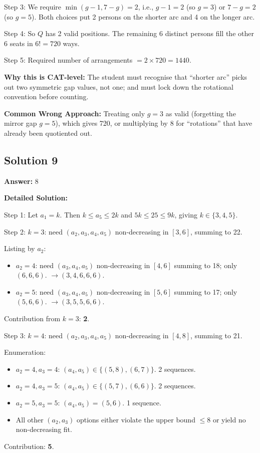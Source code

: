 \documentclass[11pt,a4paper]{article}
\begin{document}
Step 3: We require \(\min(g - 1, 7 - g) = 2\), i.e., \(g - 1 = 2\) (so \(g = 3\)) or \(7 - g = 2\) (so \(g = 5\)). Both choices put 2 persons on the shorter arc and 4 on the longer arc.

Step 4: So \(Q\) has 2 valid positions. The remaining 6 distinct persons fill the other 6 seats in \(6! = 720\) ways.

Step 5: Required number of arrangements \(= 2 \times 720 = 1440\).

\textbf{Why this is CAT-level:} The student must recognise that ``shorter arc'' picks out two symmetric gap values, not one; and must lock down the rotational convention before counting.

\textbf{Common Wrong Approach:} Treating only \(g = 3\) as valid (forgetting the mirror gap \(g = 5\)), which gives 720, or multiplying by 8 for ``rotations'' that have already been quotiented out.

\subsection*{Solution 9}
\textbf{Answer:} 8

\textbf{Detailed Solution:}

Step 1: Let \(a_1 = k\). Then \(k \leq a_5 \leq 2k\) and \(5k \leq 25 \leq 9k\), giving \(k \in \{3, 4, 5\}\).

Step 2: \(k = 3\): need \((a_2, a_3, a_4, a_5)\) non-decreasing in \([3, 6]\), summing to 22.

Listing by \(a_2\):
\begin{itemize}[leftmargin=*,topsep=0pt,itemsep=0pt]
    \item \(a_2 = 4\): need \((a_3, a_4, a_5)\) non-decreasing in \([4, 6]\) summing to 18; only \((6, 6, 6)\). \(\to (3, 4, 6, 6, 6)\).
    \item \(a_2 = 5\): need \((a_3, a_4, a_5)\) non-decreasing in \([5, 6]\) summing to 17; only \((5, 6, 6)\). \(\to (3, 5, 5, 6, 6)\).
\end{itemize}
Contribution from \(k = 3\): \textbf{2}.

Step 3: \(k = 4\): need \((a_2, a_3, a_4, a_5)\) non-decreasing in \([4, 8]\), summing to 21.

Enumeration:
\begin{itemize}[leftmargin=*,topsep=0pt,itemsep=0pt]
    \item \(a_2 = 4, a_3 = 4\): \((a_4, a_5) \in \{(5, 8), (6, 7)\}\). 2 sequences.
    \item \(a_2 = 4, a_3 = 5\): \((a_4, a_5) \in \{(5, 7), (6, 6)\}\). 2 sequences.
    \item \(a_2 = 5, a_3 = 5\): \((a_4, a_5) = (5, 6)\). 1 sequence.
    \item All other \((a_2, a_3)\) options either violate the upper bound \(\leq 8\) or yield no non-decreasing fit.
\end{itemize}
Contribution: \textbf{5}.
\end{document}
